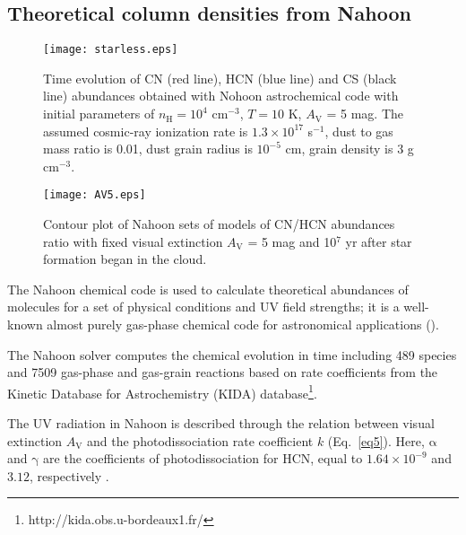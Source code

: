 \documentclass{aa}
\begin{document}
\subsection{Theoretical column densities from Nahoon}
\label{subsection:nahoon}

\begin{figure} 
\centering 
\texttt{[image: starless.eps]} 
\caption{Time evolution of CN
(red line), HCN (blue line) and CS (black line) abundances obtained with Nohoon astrochemical code
with initial parameters of $n_\mathrm{H} = 10^4$ cm$^{-3}$, $T = 10$ K, $A_\mathrm{V}$ =
5 mag. The assumed cosmic-ray ionization rate is $1.3\times10^{17}$ s$^{-1}$, dust to gas mass ratio
is 0.01, dust grain radius is $10^{-5}$ cm, grain density is 3 g cm$^{-3}$.} 
\label{starless}
\end{figure}
\begin{figure} 
\centering 
\texttt{[image: AV5.eps]} 
\caption{Contour plot of Nahoon sets
of models of CN/HCN abundances ratio with fixed visual extinction $A_\mathrm{V}$ = 5 mag and 10$^{7}$ yr after star formation began in the cloud.} 
\label{AV5} 
\end{figure}
The Nahoon chemical code is used to calculate theoretical abundances of 
molecules for a set of physical conditions and UV field strengths; it is a well-known
almost purely gas-phase chemical code for astronomical applications (\citealt{Wak15}). 

The Nahoon solver computes the chemical evolution in time including 489 species
and 7509 gas-phase and gas-grain reactions based on rate coefficients from the Kinetic
Database for Astrochemistry (KIDA) database\footnote{http://kida.obs.u-bordeaux1.fr/}. 

The UV radiation in Nahoon is described through the relation
between visual extinction $A_\mathrm{V}$ and the photodissociation rate coefficient $k$
(Eq.~\ref{eq5}). Here, $\mathrm{\alpha}$ and $\mathrm{\gamma}$ are the coefficients
of photodissociation for HCN, equal to $1.64\times10^{-9}$ and $3.12$, respectively \citep{Hea17}.
\end{document}
